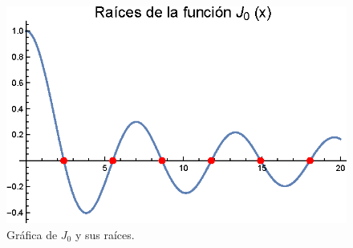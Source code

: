 \begin{figure}[H]
    \centering
    \includegraphics[scale=1.2]{Imagenes/Plot_Bessel_Cadena_01_Raices_J0.eps}
    \caption{Gráfica de $J_{0}$ y sus raíces.}
    \label{fig:figura_raices_J0}
\end{figure}

